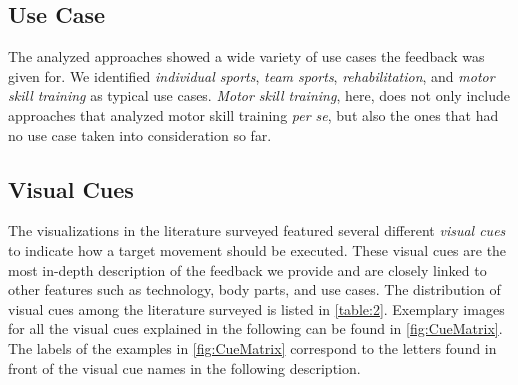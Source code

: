\subsection*{Use Case}
The analyzed approaches showed a wide variety of use cases the feedback was given for. We identified \textit{individual sports}, \textit{team sports}, \textit{rehabilitation}, and \textit{motor skill training} as typical use cases. \textit{Motor skill training}, here, does not only include approaches that analyzed motor skill training \emph{per se}, but also the ones that had no use case taken into consideration so far.


\subsection*{Visual Cues \label{sec:visualCues}}
The visualizations in the literature surveyed featured several different \textit{visual cues} to indicate how a target movement should be executed. These visual cues are the most in-depth description of the feedback we provide and are closely linked to other features such as technology, body parts, and use cases. The distribution of visual cues among the literature surveyed is listed in \autoref{table:2}. Exemplary images for all the visual cues explained in the following can be found in \autoref{fig:CueMatrix}. The labels of the examples in  \autoref{fig:CueMatrix} correspond to the letters found in front of the visual cue names in the following description.

